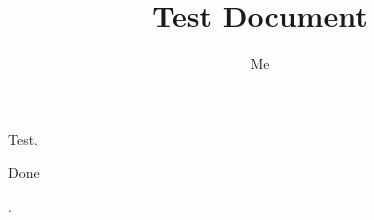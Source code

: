 \documentclass{report}
\author{Me}
\title{Test Document}
\newcommand*{\inputchap}{ Done}
\begin{document}
\maketitle



Test.

\inputchap
%

\test.
\end{document}
